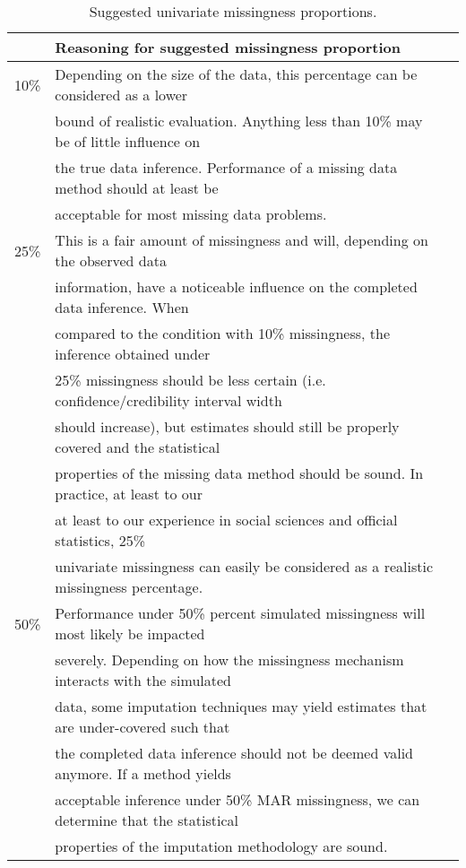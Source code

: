 \documentclass[bimj,fleqn]{w-art}
\begin{document}
\begin{table}[htb]
\begin{center}
\caption{Suggested univariate missingness proportions.}
\label{table:prop}
\begin{tabular}{lll}
\hline
      & Reasoning for suggested missingness proportion \\
\hline  
10\%  & Depending on the size of the data, this percentage can be considered as a lower \\
      & bound of realistic evaluation. Anything less than 10\% may be of little influence on \\
      & the true data inference. Performance of a missing data method should at least be \\
      & acceptable for most missing data problems. \\ %
25\%  & This is a fair amount of missingness and will, depending on the observed data \\
      & information, have a noticeable influence on the completed data inference. When \\
      & compared to the condition with 10\% missingness, the inference obtained under \\
      & 25\% missingness should be less certain (i.e. confidence/credibility interval width \\
      & should increase), but estimates should still be properly covered and the statistical \\
      & properties of the missing data method should be sound. In practice, at least to our \\
      & at least to our experience in social sciences and official statistics, 25\% \\
      & univariate missingness can easily be considered as a realistic missingness percentage. \\ %
50\%  & Performance under 50\% percent simulated missingness will most likely be impacted \\ 
      & severely. Depending on how the missingness mechanism interacts with the simulated \\
      & data, some imputation techniques may yield estimates that are under-covered such that \\
      & the completed data inference should not be deemed valid anymore. If a method yields \\
      & acceptable inference under 50\% MAR missingness, we can determine that the statistical \\
      & properties of the imputation methodology are sound. \\
\hline
\end{tabular}
\end{center}
\end{table}
\end{document}
